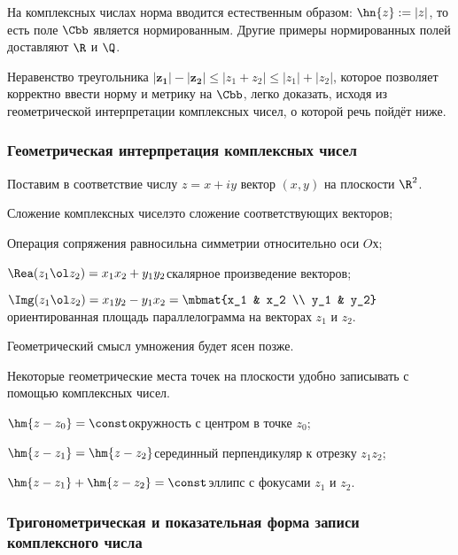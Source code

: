 \documentclass[a4paper]{article}
\begin{document}
На комплексных числах норма вводится естественным образом: $\hn{z} := |z|$, то есть поле $\Cbb$ является нормированным.
Другие примеры нормированных полей доставляют $\R$ и $\Q$.

Неравенство треугольника $\bm{|z_1|-|z_2|}\le |z_1+z_2|\le|z_1|+|z_2|$, которое позволяет корректно ввести норму
и метрику на $\Cbb$, легко доказать, исходя из геометрической интерпретации комплексных чисел, о которой
речь пойдёт ниже.

\subsubsection{Геометрическая интерпретация комплексных чисел}

Поставим в соответствие числу $z = x + iy$ вектор $(x,y)$ на плоскости $\R^2$.

\begin{items}{-2}
\item Сложение комплексных чисел\т это сложение соответствующих векторов;
\item Операция сопряжения равносильна симметрии относительно оси $Oх$;
\item $\Rea(z_1\ol z_2) = x_1 x_2 + y_1 y_2$\т скалярное произведение векторов;
\item $\Img(z_1\ol z_2) = x_1 y_2 - y_1 x_2 = \mbmat{x_1 & x_2 \\ y_1 & y_2}$\т ориентированная площадь
параллелограмма на векторах $z_1$ и $z_2$.
\end{items}

Геометрический смысл умножения будет ясен позже.

Некоторые геометрические места точек на плоскости удобно записывать с помощью комплексных чисел.

\begin{ex}
\begin{items}{-2}
\item $\hm{z - z_0} = \const$\т окружность с центром в точке $z_0$;
\item $\hm{z - z_1} = \hm{z - z_2 }$\т серединный перпендикуляр к отрезку $z_1z_2$;
\item $\hm{z - z_1} + \hm{z - z_2 } = \const$\т эллипс с фокусами $z_1$ и $z_2$.
\end{items}
\end{ex}

\subsubsection{Тригонометрическая и показательная форма записи комплексного числа}
\end{document}
